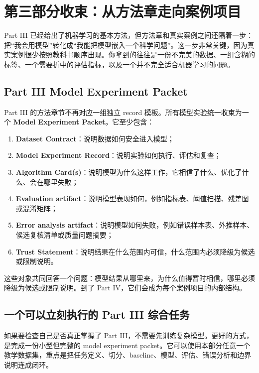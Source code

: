 \chapter*{第三部分收束：从方法章走向案例项目}

Part III 已经给出了机器学习的基本方法，但方法章和真实案例之间还隔着一步：把“我会用模型”转化成“我能把模型嵌入一个科学问题”。这一步非常关键，因为真实案例很少按照教科书顺序出现。你拿到的往往是一份不完美的数据、一组含糊的标签、一个需要折中的评估指标，以及一个并不完全适合机器学习的问题。

\section*{Part III Model Experiment Packet}

Part III 的方法章节不再对应一组独立 record 模板。所有模型实验统一收束为一个 \textbf{Model Experiment Packet}。它至少包含：

\begin{enumerate}
    \item \textbf{Dataset Contract}：说明数据如何安全进入模型；
    \item \textbf{Model Experiment Record}：说明实验如何执行、评估和复查；
    \item \textbf{Algorithm Card(s)}：说明模型为什么这样工作，它相信了什么、优化了什么、会在哪里失败；
    \item \textbf{Evaluation artifact}：说明模型表现如何，例如指标表、阈值扫描、残差图或混淆矩阵；
    \item \textbf{Error analysis artifact}：说明模型如何失败，例如错误样本表、外推样本、候选复核清单或质量问题摘要；
    \item \textbf{Trust Statement}：说明结果在什么范围内可信，什么范围内必须降级为候选或限制说明。
\end{enumerate}

这些对象共同回答一个问题：模型结果从哪里来，为什么值得暂时相信，哪里必须降级为候选或限制说明。到了 Part IV，它们会成为每个案例项目的内部结构。

\section*{一个可以立刻执行的 Part III 综合任务}

如果要检查自己是否真正掌握了 Part III，不需要先训练复杂模型。更好的方式，是完成一份小型但完整的 model experiment packet。它可以使用本部分任意一个教学数据集，重点是把任务定义、切分、baseline、模型、评估、错误分析和边界说明连成闭环。

